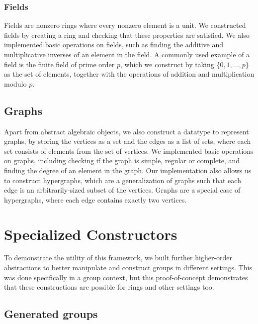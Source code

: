 \documentclass{article}
\begin{document}
		\subsubsection{Fields}
           		Fields are nonzero rings where every nonzero element is a unit. We constructed fields by creating a ring and checking that these properties are satisfied. We also implemented basic operations on fields, such as finding the additive and multiplicative inverses of an element in the field. A commonly used example of a field is the finite field of prime order $p$, which we construct by taking $\{0,1,..., p\}$ as the set of elements, together with the operations of addition and multiplication modulo $p$.
        
        
        \subsection{Graphs}
            Apart from abstract algebraic objects, we also construct a datatype to represent graphs, by storing the vertices as a set and the edges as a list of sets, where each set consists of elements from the set of vertices. We implemented basic operations on graphs, including checking if the graph is simple, regular or complete, and finding the degree of an element in the graph. Our implementation also allows us to construct hypergraphs, which are a generalization of graphs such that each edge is an arbitrarily-sized subset of the vertices. Graphs are a special case of hypergraphs, where each edge contains exactly two vertices.
    
    
    
    \section{Specialized Constructors}
    \label{constructors}
        
        To demonstrate the utility of this framework, we built further higher-order abstractions to better manipulate and construct groups in different settings. This was done specifically in a group context, but this proof-of-concept demonstrates that these constructions are possible for rings and other settings too.
        
        \subsection{Generated groups}
        \label{generated-groups}
        
\end{document}
